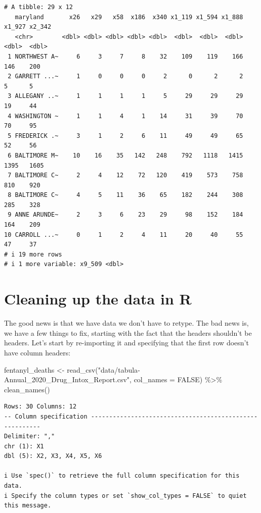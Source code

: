 \documentclass[
  letterpaper,
  DIV=11,
  numbers=noendperiod]{scrreprt}
\newenvironment{Shaded}{\begin{snugshade}}{\end{snugshade}}
\newcommand{\AttributeTok}[1]{\textcolor[rgb]{0.40,0.45,0.13}{#1}}
\newcommand{\ConstantTok}[1]{\textcolor[rgb]{0.56,0.35,0.01}{#1}}
\newcommand{\FunctionTok}[1]{\textcolor[rgb]{0.28,0.35,0.67}{#1}}
\newcommand{\NormalTok}[1]{\textcolor[rgb]{0.00,0.23,0.31}{#1}}
\newcommand{\OtherTok}[1]{\textcolor[rgb]{0.00,0.23,0.31}{#1}}
\newcommand{\SpecialCharTok}[1]{\textcolor[rgb]{0.37,0.37,0.37}{#1}}
\newcommand{\StringTok}[1]{\textcolor[rgb]{0.13,0.47,0.30}{#1}}
\begin{document}
\begin{verbatim}
# A tibble: 29 x 12
   maryland       x26   x29   x58  x186  x340 x1_119 x1_594 x1_888 x1_927 x2_342
   <chr>        <dbl> <dbl> <dbl> <dbl> <dbl>  <dbl>  <dbl>  <dbl>  <dbl>  <dbl>
 1 NORTHWEST A~     6     3     7     8    32    109    119    166    146    200
 2 GARRETT ...~     1     0     0     0     2      0      2      2      5      5
 3 ALLEGANY ..~     1     1     1     1     5     29     29     29     19     44
 4 WASHINGTON ~     1     1     4     1    14     31     39     70     70     95
 5 FREDERICK .~     3     1     2     6    11     49     49     65     52     56
 6 BALTIMORE M~    10    16    35   142   248    792   1118   1415   1395   1605
 7 BALTIMORE C~     2     4    12    72   120    419    573    758    810    920
 8 BALTIMORE C~     4     5    11    36    65    182    244    308    285    328
 9 ANNE ARUNDE~     2     3     6    23    29     98    152    184    164    209
10 CARROLL ...~     0     1     2     4    11     20     40     55     47     37
# i 19 more rows
# i 1 more variable: x9_509 <dbl>
\end{verbatim}

\hypertarget{cleaning-up-the-data-in-r}{%
\section{Cleaning up the data in R}\label{cleaning-up-the-data-in-r}}

The good news is that we have data we don't have to retype. The bad news
is, we have a few things to fix, starting with the fact that the headers
shouldn't be headers. Let's start by re-importing it and specifying that
the first row doesn't have column headers:

\begin{Shaded}
\begin{Highlighting}[]
\NormalTok{fentanyl\_deaths }\OtherTok{\textless{}{-}} \FunctionTok{read\_csv}\NormalTok{(}\StringTok{"data/tabula{-}Annual\_2020\_Drug\_Intox\_Report.csv"}\NormalTok{, }\AttributeTok{col\_names =} \ConstantTok{FALSE}\NormalTok{) }\SpecialCharTok{\%\textgreater{}\%} \FunctionTok{clean\_names}\NormalTok{()}
\end{Highlighting}
\end{Shaded}

\begin{verbatim}
Rows: 30 Columns: 12
-- Column specification --------------------------------------------------------
Delimiter: ","
chr (1): X1
dbl (5): X2, X3, X4, X5, X6

i Use `spec()` to retrieve the full column specification for this data.
i Specify the column types or set `show_col_types = FALSE` to quiet this message.
\end{verbatim}
\end{document}
